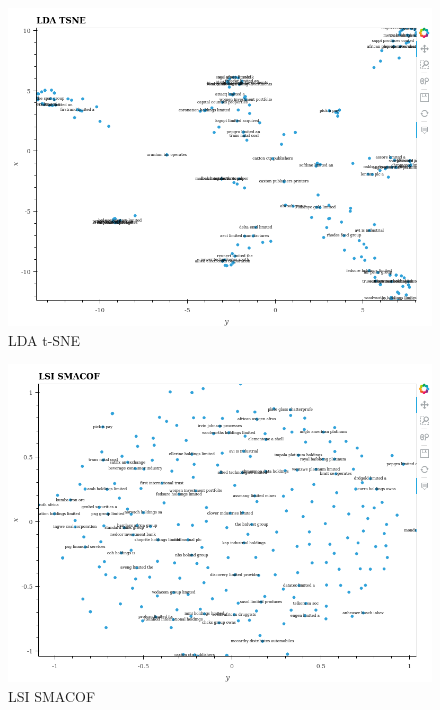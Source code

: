 \documentclass[11pt]{article}
\makeatletter
\def\maxwidth{\ifdim\Gin@nat@width>\linewidth\linewidth
    \else\Gin@nat@width\fi}
\let\Oldincludegraphics\includegraphics
\renewcommand{\includegraphics}[1]{\Oldincludegraphics[width=.8\maxwidth]{#1}}
\makeatother
\begin{document}
\begin{figure}
\centering
\includegraphics{../experiments/media/LDA TSNE.png}
\caption{LDA t-SNE}
\end{figure}

\begin{figure}
\centering
\includegraphics{../experiments/media/LSI SMACOF.png}
\caption{LSI SMACOF}
\end{figure}
\end{document}
